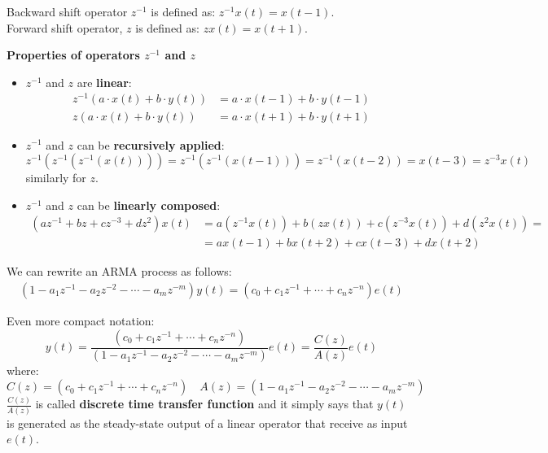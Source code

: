 \begin{definition}
Backward shift operator $z^{-1}$ is defined as: $z^{-1} x(t)=x(t-1)$.\\
Forward shift operator, $z$ is defined as: $z x(t)=x(t+1)$.	
\end{definition}

\textbf{Properties of operators $z^{-1}$ and $z$}

\begin{itemize}
	\item $z^{-1}$ and $z$ are \textbf{linear}:
		\begin{align*}
			z^{-1}(a \cdot x(t)+b \cdot y(t))&=a \cdot x(t-1)+b \cdot y(t-1) \\
			z(a \cdot x(t)+b \cdot y(t))&=a \cdot x(t+1)+b \cdot y(t+1)
		\end{align*}
	\item $z^{-1}$ and $z$ can be \textbf{recursively applied}:
		\[
			z^{-1}(z^{-1}(z^{-1}(x(t))))=z^{-1}(z^{-1}(x(t-1)))=z^{-1}(x(t-2))=x(t-3)=z^{-3} x(t)
		\]
		similarly for $z$.
	\item $z^{-1}$ and $z$ can be \textbf{linearly composed}:
		\begin{align*}
			(a z^{-1}+b z+c z^{-3}+d z^{2}) x(t)&=a(z^{-1} x(t))+b(z x(t))+c(z^{-3} x(t))+d(z^{2} x(t))= \\
			&=a x(t-1)+b x(t+2)+c x(t-3)+d x(t+2)
		\end{align*}
\end{itemize}

We can rewrite an ARMA process as follows:
\begin{align*}
	\left(1-a_{1} z^{-1}-a_{2} z^{-2}-\cdots-a_{m} z^{-m}\right) y(t)=\left(c_{0}+c_{1} z^{-1}+\cdots+c_{n} z^{-n}\right) e(t)
\end{align*}

Even more compact notation:
\[
	\boxed{y(t)=\frac{\left(c_{0}+c_{1} z^{-1}+\cdots+c_{n} z^{-n}\right)}{\left(1-a_{1} z^{-1}-a_{2} z^{-2}-\cdots-a_{m} z^{-m}\right)} e(t)=\frac{C(z)}{A(z)} e(t)}
\]
where:
\[
	\boxed{C(z)=\left(c_{0}+c_{1} z^{-1}+\cdots+c_{n} z^{-n}\right)} \quad \boxed{A(z)=\left(1-a_{1} z^{-1}-a_{2} z^{-2}-\cdots-a_{m} z^{-m}\right)}
\]
$\frac{C(z)}{A(z)}$ is called \textbf{discrete time transfer function} and it simply says that $y(t)$ is generated as the steady-state output of a linear operator that receive as input $e(t)$.